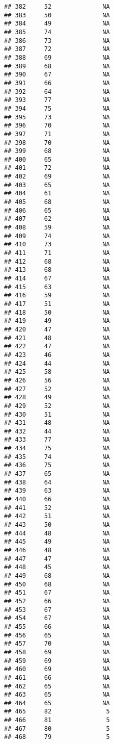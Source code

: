 \documentclass[]{article}
\begin{document}
\begin{verbatim}
## 382     52              NA
## 383     50              NA
## 384     49              NA
## 385     74              NA
## 386     73              NA
## 387     72              NA
## 388     69              NA
## 389     68              NA
## 390     67              NA
## 391     66              NA
## 392     64              NA
## 393     77              NA
## 394     75              NA
## 395     73              NA
## 396     70              NA
## 397     71              NA
## 398     70              NA
## 399     68              NA
## 400     65              NA
## 401     72              NA
## 402     69              NA
## 403     65              NA
## 404     61              NA
## 405     68              NA
## 406     65              NA
## 407     62              NA
## 408     59              NA
## 409     74              NA
## 410     73              NA
## 411     71              NA
## 412     68              NA
## 413     68              NA
## 414     67              NA
## 415     63              NA
## 416     59              NA
## 417     51              NA
## 418     50              NA
## 419     49              NA
## 420     47              NA
## 421     48              NA
## 422     47              NA
## 423     46              NA
## 424     44              NA
## 425     58              NA
## 426     56              NA
## 427     52              NA
## 428     49              NA
## 429     52              NA
## 430     51              NA
## 431     48              NA
## 432     44              NA
## 433     77              NA
## 434     75              NA
## 435     74              NA
## 436     75              NA
## 437     65              NA
## 438     64              NA
## 439     63              NA
## 440     66              NA
## 441     52              NA
## 442     51              NA
## 443     50              NA
## 444     48              NA
## 445     49              NA
## 446     48              NA
## 447     47              NA
## 448     45              NA
## 449     68              NA
## 450     68              NA
## 451     67              NA
## 452     66              NA
## 453     67              NA
## 454     67              NA
## 455     66              NA
## 456     65              NA
## 457     70              NA
## 458     69              NA
## 459     69              NA
## 460     69              NA
## 461     66              NA
## 462     65              NA
## 463     65              NA
## 464     65              NA
## 465     82               5
## 466     81               5
## 467     80               5
## 468     79               5

\end{verbatim}
\end{document}
